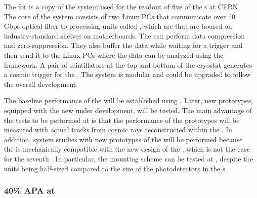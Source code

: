 The  for  is a copy of the system used for the readout
of five of the  s at CERN. The core of the  system 
consists of two Linux PCs that communicate over 10 Gbps optical fiber
to processing units called , which are  that are
housed on industry-standard  shelves on  motherboards.
The  can perform data compression and zero-suppression. They also buffer
the data while waiting for a trigger and then send it to the Linux PCs where the data can
be analyzed using the  framework. A pair of scintillators at the top and
bottom of the cryostat generates a cosmic trigger for the .
The system is modular and could be upgraded to follow the overall   
development. 

The baseline performance of the  
will be established using  . Later, new prototypes, equipped
with the new  under development, will be tested. The main advantage
of the tests to be performed at  is that the performance of the
 prototypes will be measured with actual tracks from cosmic rays 
reconstructed within the . In addition, system studies with new 
prototypes of the  will be performed because the  is
mechanically compatible with the new design of the , which is not
the case for the seventh  .  In particular, the  mounting
scheme can be tested at , despite the units being half-sized compared to the
size of the photodetectors in the   s.


\subsubsection{40\% APA at }
\label{sec:fdsp-tpcelec-qa-facilities-fortypercent}

